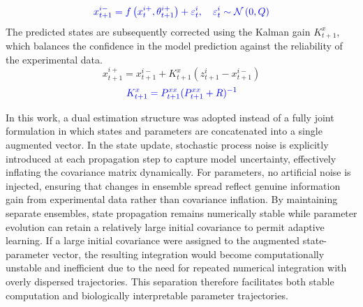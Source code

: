 \begin{equation}
{\color{blue}x_{t+1}^{i-}=f\left(x_t^{i+},\theta_{t+1}^{i+}\right)+\varepsilon_t^i,\quad
\varepsilon_t^i\sim \mathcal{N}\left(0, Q\right)}
\label{posterior_pred}
\end{equation}
The predicted states are subsequently corrected using the  Kalman gain $K_{t+1}^x$, which balances the confidence in the model prediction against the reliability of the experimental data.
\begin{equation}
x_{t+1}^{i+} = x_{t+1}^{i-} + K_{t+1}^x(z_{t+1}^i - x_{t+1}^{i-})
\label{state_update}
\end{equation}
\begin{equation}
{\color{blue}K_{t+1}^x = P_{t+1}^{xx} (P_{t+1}^{xx} + R)^{-1}}
\label{states_gain}
\end{equation}


In this work, a dual estimation structure was adopted instead of a fully joint formulation in which states and parameters are concatenated into a single augmented vector. In the state update, stochastic process noise is explicitly introduced at each propagation step to capture model uncertainty, effectively inflating the covariance matrix dynamically. For parameters, no artificial noise is injected, ensuring that changes in ensemble spread reflect genuine information gain from experimental data rather than covariance inflation. By maintaining separate ensembles, state propagation remains numerically stable while parameter evolution can retain a relatively large initial covariance to permit adaptive learning. If a large initial covariance were assigned to the augmented state-parameter vector, the resulting integration would become computationally unstable and inefficient due to the need for repeated numerical integration with overly dispersed trajectories. This separation therefore facilitates both stable computation and biologically interpretable parameter trajectories. 

